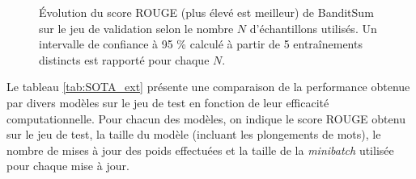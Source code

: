 \begin{figure}[ht!]
\begin{center}
    \end{center}
    \caption[Performance de BanditSum sur le jeu de validation selon le nombre d'échantillons utilisés]
    {Évolution du score ROUGE (plus élevé est meilleur) de BanditSum sur le jeu de validation
     selon le nombre $N$ d'échantillons utilisés.
             Un intervalle de confiance à 95 \% calculé à partir de 5 entraînements distincts
             est rapporté pour chaque $N$.}
    \label{fig:bs_learning_curve}
\end{figure}

Le tableau \ref{tab:SOTA_ext} présente une comparaison de la performance 
obtenue par divers modèles sur le jeu de test en fonction de leur efficacité computationnelle.  
Pour chacun des modèles, on indique le score ROUGE 
obtenu sur le jeu de test, la taille du modèle (incluant les 
plongements de mots), le nombre de mises à jour 
des poids effectuées et la taille de la \textit{minibatch} utilisée 
pour chaque mise à jour.


